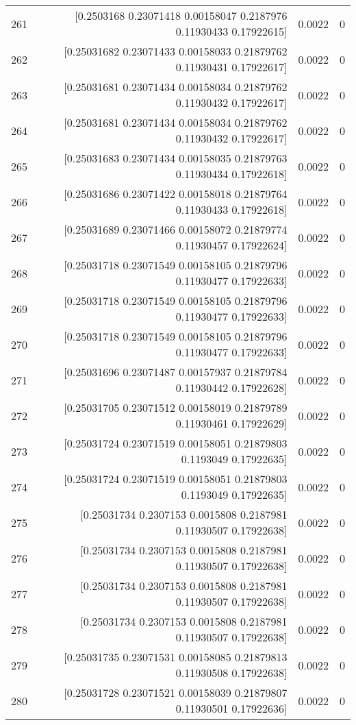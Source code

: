 \begin{longtable}{lrrr}
261 & [0.2503168  0.23071418 0.00158047 0.2187976  0.11930433 0.17922615] & 0.0022 & 0 \\
262 & [0.25031682 0.23071433 0.00158033 0.21879762 0.11930431 0.17922617] & 0.0022 & 0 \\
263 & [0.25031681 0.23071434 0.00158034 0.21879762 0.11930432 0.17922617] & 0.0022 & 0 \\
264 & [0.25031681 0.23071434 0.00158034 0.21879762 0.11930432 0.17922617] & 0.0022 & 0 \\
265 & [0.25031683 0.23071434 0.00158035 0.21879763 0.11930434 0.17922618] & 0.0022 & 0 \\
266 & [0.25031686 0.23071422 0.00158018 0.21879764 0.11930433 0.17922618] & 0.0022 & 0 \\
267 & [0.25031689 0.23071466 0.00158072 0.21879774 0.11930457 0.17922624] & 0.0022 & 0 \\
268 & [0.25031718 0.23071549 0.00158105 0.21879796 0.11930477 0.17922633] & 0.0022 & 0 \\
269 & [0.25031718 0.23071549 0.00158105 0.21879796 0.11930477 0.17922633] & 0.0022 & 0 \\
270 & [0.25031718 0.23071549 0.00158105 0.21879796 0.11930477 0.17922633] & 0.0022 & 0 \\
271 & [0.25031696 0.23071487 0.00157937 0.21879784 0.11930442 0.17922628] & 0.0022 & 0 \\
272 & [0.25031705 0.23071512 0.00158019 0.21879789 0.11930461 0.17922629] & 0.0022 & 0 \\
273 & [0.25031724 0.23071519 0.00158051 0.21879803 0.1193049  0.17922635] & 0.0022 & 0 \\
274 & [0.25031724 0.23071519 0.00158051 0.21879803 0.1193049  0.17922635] & 0.0022 & 0 \\
275 & [0.25031734 0.2307153  0.0015808  0.2187981  0.11930507 0.17922638] & 0.0022 & 0 \\
276 & [0.25031734 0.2307153  0.0015808  0.2187981  0.11930507 0.17922638] & 0.0022 & 0 \\
277 & [0.25031734 0.2307153  0.0015808  0.2187981  0.11930507 0.17922638] & 0.0022 & 0 \\
278 & [0.25031734 0.2307153  0.0015808  0.2187981  0.11930507 0.17922638] & 0.0022 & 0 \\
279 & [0.25031735 0.23071531 0.00158085 0.21879813 0.11930508 0.17922638] & 0.0022 & 0 \\
280 & [0.25031728 0.23071521 0.00158039 0.21879807 0.11930501 0.17922636] & 0.0022 & 0 \\

\end{longtable}
